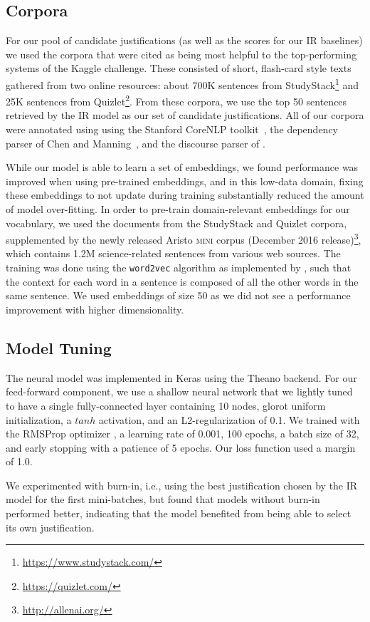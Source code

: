 \subsection{Corpora}
For our pool of candidate justifications (as well as the scores for our IR baselines) we used the corpora that were cited as being most helpful to the top-performing systems of the Kaggle challenge.  These consisted of short, flash-card style texts gathered from two online resources:  about 700K sentences from StudyStack\footnote{{\scriptsize \url{https://www.studystack.com/}}} and 25K sentences from Quizlet\footnote{{\scriptsize \url{https://quizlet.com/}}}.
From these corpora, we use the top 50 sentences retrieved by the IR model as our set of candidate justifications.  All of our corpora were annotated using using the Stanford CoreNLP toolkit~\cite{manning2014stanford}, the dependency parser of Chen and Manning~, and the discourse parser of \citet{Surdeanu:15}.

While our model is able to learn a set of embeddings, we found performance was improved when using pre-trained embeddings, and in this low-data domain, fixing these embeddings to not update during training substantially reduced the amount of model over-fitting.   In order to pre-train domain-relevant embeddings for our vocabulary, we used the documents from the StudyStack and Quizlet corpora, supplemented by the newly released Aristo \textsc{mini} corpus (December 2016 release)\footnote{{\scriptsize \url{http://allenai.org/}}}, which contains 1.2M science-related sentences from various web sources.  The training was done using the \texttt{word2vec} algorithm \cite{mikolov10, mikolov13} as implemented by \citet{levy2014dependency}, such that the context for each word in a sentence is composed of all the other words in the same sentence.  We used embeddings of size 50 as we did not see a performance improvement with higher dimensionality.

\subsection{Model Tuning}
The neural model was implemented in Keras \cite{chollet2015keras} using the Theano \cite{2016arXiv160502688short} backend.  For our feed-forward component, we use a shallow neural network that we lightly tuned to have a single fully-connected layer containing 10 nodes, glorot uniform initialization, a $tanh$ activation, and an L2-regularization of 0.1.  We trained with the RMSProp optimizer \citep{rmsprop},  a learning rate of 0.001, 100 epochs, a batch size of 32, and early stopping with a patience of 5 epochs.  Our loss function used a margin of 1.0.  

We experimented with burn-in, i.e., using the best justification chosen by the IR model for the first mini-batches, but found that models without burn-in performed better, indicating that the model benefited from being able to select its own justification.
 